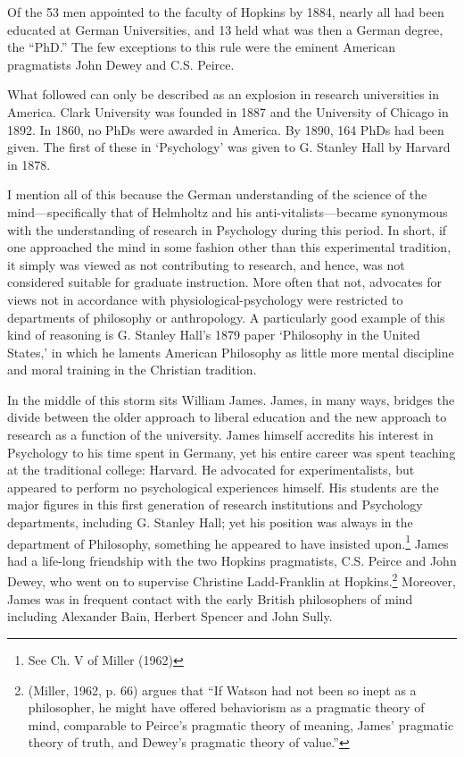 Of the 53 men appointed to the faculty of Hopkins by 1884, nearly all had been educated at German Universities, and 13 held what was then a German degree, the “PhD.” The few exceptions to this rule were the eminent American pragmatists John Dewey and C.S. Peirce. 

What followed can only be described as an explosion in research universities in America. Clark University was founded in 1887 and the University of Chicago in 1892. In 1860, no PhDs were awarded in America. By 1890, 164 PhDs had been given. The first of these in ‘Psychology’ was given to G. Stanley Hall by Harvard in 1878.

I mention all of this because the German understanding of the science of the mind---specifically that of Helmholtz and his anti-vitalists---became synonymous with the understanding of research in Psychology during this period. In short, if one approached the mind in some fashion other than this experimental tradition, it simply was viewed as not contributing to research, and hence, was not considered suitable for graduate instruction. More often that not, advocates for views not in accordance with physiological-psychology were restricted to departments of philosophy or anthropology. A particularly good example of this kind of reasoning is G. Stanley Hall’s 1879 paper ‘Philosophy in the United States,’ in which he laments American Philosophy as little more mental discipline and moral training in the Christian tradition.

In the middle of this storm sits William James. James, in many ways, bridges the divide between the older approach to liberal education and the new approach to research as a function of the university. James himself accredits his interest in Psychology to his time spent in Germany, yet his entire career was spent teaching at the traditional college: Harvard. He advocated for experimentalists, but appeared to perform no psychological experiences himself. His students are the major figures in this first generation of research institutions and Psychology departments, including G. Stanley Hall; yet his position was always in the department of Philosophy, something he appeared to have insisted upon.\footnote{See Ch. V of Miller (1962)} James had a life-long friendship with the two Hopkins pragmatists, C.S. Peirce and John Dewey, who went on to supervise Christine Ladd-Franklin at Hopkins.\footnote{(Miller, 1962, p. 66) argues that “If Watson had not been so inept as a philosopher, he might have offered behaviorism as a pragmatic theory of mind, comparable to Peirce’s pragmatic theory of meaning, James’ pragmatic theory of truth, and Dewey’s pragmatic theory of value.”} Moreover, James was in frequent contact with the early British philosophers of mind including Alexander Bain, Herbert Spencer and John Sully. 

